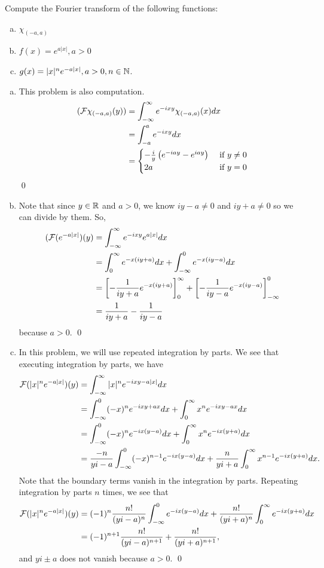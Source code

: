 \documentclass{article}
\begin{document}
\newpage
{} Compute the Fourier transform of the following functions:
\begin{enumerate}[(a)]
    \item $\chi_{(-a,a)}$
    \item $f(x) = e^{a|x|}, a > 0$
    \item $g(x) = |x|^ne^{-a|x|}, a>0, n \in \NN$. \tri
\end{enumerate} 
\solution
\begin{enumerate}[(a)]
    \item This problem is also computation.
    \begin{align*}
        (\cal{F}\chi_{(-a,a)}(y)) &= \int_{-\infty}^\infty e^{-ixy}\chi_{(-a,a)}(x) dx \\
        &= \int_{-a}^a e^{-ixy}dx \\
        &=\begin{cases}
            -\frac{i}{y}\del{e^{-iay}-e^{iay}} &\text{ if } y \ne 0\\
            2a &\text{ if } y =0
        \end{cases}
    \end{align*}
    \qed
    \item  Note that since $y \in \RR$ and $a > 0$, we know $iy - a \ne 0$ and $iy+a \ne 0$ so we can divide by them. So, 
    \begin{align*}
        (\cal{F}(e^{-a|x|})(y) &= \int_{-\infty}^{\infty}e^{-ixy}e^{a|x|}dx\\
        &= \int_{0}^{\infty}e^{-x(iy+a)}dx+\int_{-\infty}^{0}e^{-x(iy-a)}dx \\
        &= \sbr{-\frac{1}{iy+a}e^{-x(iy+a)}}_0^\infty+\sbr{-\frac{1}{iy-a}e^{-x(iy-a)}}_{-\infty}^0\\
        &= \frac{1}{iy+a} - \frac{1}{iy-a}
    \end{align*}
    because $a>0$. \qed
    \item In this problem, we will use repeated integration by parts. We see that executing integration by parts, we have
    \begin{align*}
        \cal{F}(|x|^ne^{-a|x|})(y) &= \int_{-\infty}^\infty |x|^ne^{-ixy-a|x|} dx\\
        &=  \int_{-\infty}^0 (-x)^ne^{-ixy+ax} dx+   \int_0^\infty x^ne^{-ixy-ax}dx\\
        &=  \int_{-\infty}^0 (-x)^ne^{-ix(y-a)} dx+   \int_0^\infty x^ne^{-ix(y+a)}dx \\
        &=  \frac{-n}{yi-a}\int_{-\infty}^0 (-x)^{n-1}e^{-ix(y-a)} dx+  \frac{n}{yi+a} \int_0^\infty x^{n-1}e^{-ix(y+a)}dx.
    \end{align*}
    Note that the boundary terms vanish in the integration by parts. Repeating integration by parts $n$ times, we see that
    \begin{align*}
        \cal{F}(|x|^ne^{-a|x|})(y) &= (-1)^n\frac{n!}{(yi-a)^n}\int_{-\infty}^0 e^{-ix(y-a)} dx+  \frac{n!}{(yi+a)^n} \int_0^\infty e^{-ix(y+a)}dx\\
        &=  (-1)^{n+1}\frac{n!}{(yi-a)^{n+1}}+  \frac{n!}{(yi+a)^{n+1}},
    \end{align*}
    and $yi\pm a$ does not vanish because $a>0$. \qed
\end{enumerate}
\end{document}
